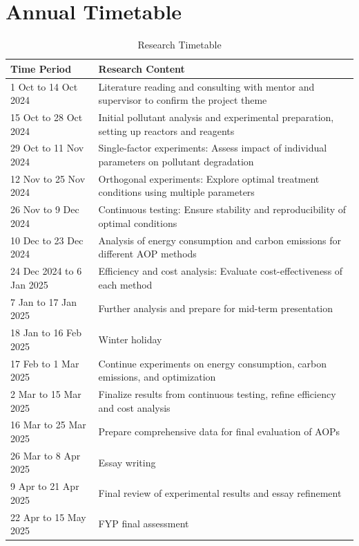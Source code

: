\documentclass[a4paper]{article}
\begin{document}
\newpage

\section{Annual Timetable}

\begin{table}[h!]
    \centering
    \begin{tabular}{|l|p{10cm}|}
    \hline
    \textbf{Time Period} & \textbf{Research Content} \\ \hline
    1 Oct to 14 Oct 2024 & Literature reading and consulting with mentor and supervisor to confirm the project theme \\ \hline
    15 Oct to 28 Oct 2024 & Initial pollutant analysis and experimental preparation, setting up reactors and reagents \\ \hline
    29 Oct to 11 Nov 2024 & Single-factor experiments: Assess impact of individual parameters on pollutant degradation \\ \hline
    12 Nov to 25 Nov 2024 & Orthogonal experiments: Explore optimal treatment conditions using multiple parameters \\ \hline
    26 Nov to 9 Dec 2024 & Continuous testing: Ensure stability and reproducibility of optimal conditions \\ \hline
    10 Dec to 23 Dec 2024 & Analysis of energy consumption and carbon emissions for different AOP methods \\ \hline
    24 Dec 2024 to 6 Jan 2025 & Efficiency and cost analysis: Evaluate cost-effectiveness of each method \\ \hline
    7 Jan to 17 Jan 2025 & Further analysis and prepare for mid-term presentation \\ \hline
    18 Jan to 16 Feb 2025 & Winter holiday \\ \hline
    17 Feb to 1 Mar 2025 & Continue experiments on energy consumption, carbon emissions, and optimization \\ \hline
    2 Mar to 15 Mar 2025 & Finalize results from continuous testing, refine efficiency and cost analysis \\ \hline
    16 Mar to 25 Mar 2025 & Prepare comprehensive data for final evaluation of AOPs \\ \hline
    26 Mar to 8 Apr 2025 & Essay writing \\ \hline
    9 Apr to 21 Apr 2025 & Final review of experimental results and essay refinement \\ \hline
    22 Apr to 15 May 2025 & FYP final assessment \\ \hline
    \end{tabular}
    \caption{Research Timetable}
\end{table}
    
\end{document}
